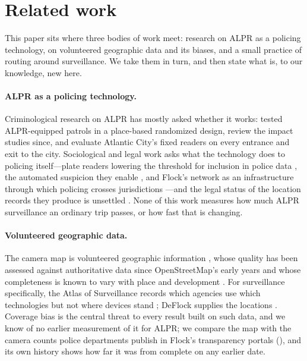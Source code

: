 \documentclass[11pt,twoside]{article}
\newcommand{\alpr}{ALPR\xspace}
\begin{document}
\section{Related work}
\label{sec:related}

This paper sits where three bodies of work meet: research on \alpr as a policing technology, on
volunteered geographic data and its biases, and a small practice of routing around surveillance.
We take them in turn, and then state what is, to our knowledge, new here.

\paragraph{\alpr as a policing technology.} Criminological research on \alpr has mostly asked
whether it works: \citet{lum2011} tested \alpr-equipped patrols in a place-based randomized
design, \citet{lum2025} review the impact studies since, and \citet{shjarback2025} evaluate
Atlantic City's fixed readers on every entrance and exit to the city. Sociological and legal
work asks what the technology does to policing itself---plate readers lowering the threshold
for inclusion in police data \citep{brayne2017}, the automated suspicion they enable
\citep{joh2016,ferguson2017}, and Flock's network as an infrastructure through which policing
crosses jurisdictions \citep{monahan2026}---and the legal status of the location records they
produce is unsettled \citep{carpenter2018,finklea2024}. None of this work measures how much
\alpr surveillance an ordinary trip passes, or how fast that is changing.

\paragraph{Volunteered geographic data.} The camera map is volunteered geographic information
\citep{goodchild2007}, whose quality has been assessed against authoritative data since
OpenStreetMap's early years \citep{haklay2010} and whose completeness is known to vary with place
and development \citep{herfort2023}. For surveillance specifically, the Atlas of Surveillance
records which agencies use which technologies but not where devices stand \citep{atlas}; DeFlock
supplies the locations \citep{deflock}. Coverage bias is the central threat to every result built
on such data, and we know of no earlier measurement of it for \alpr; we compare the map with the
camera counts police departments publish in Flock's transparency portals
(), and its own history shows how far it was from complete on any earlier date.
\end{document}
